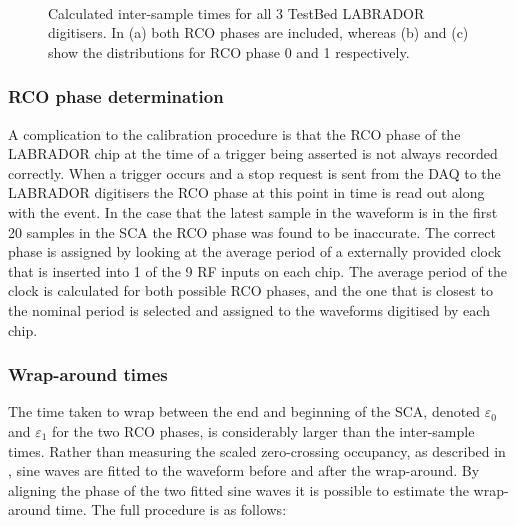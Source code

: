 \begin{figure}[htpb]
  \\
  \hfill
  \caption{Calculated inter-sample times for all 3 TestBed LABRADOR digitisers. In (a) both RCO phases are included, whereas (b) and (c) show the distributions for RCO phase 0 and 1 respectively.}
  \label{fig:calibration:LABRADOR-Digitiser-Chip:Inter-sample-times}
\end{figure}

\subsubsection{RCO phase determination}
\label{sec:calibration:LABRADOR-Digitiser-Chip:RCO-phase-determination}

A complication to the calibration procedure is that the RCO phase of the LABRADOR chip at the time of a trigger being asserted is not always recorded correctly. When a trigger occurs and a stop request is sent from the DAQ to the LABRADOR digitisers the RCO phase at this point in time is read out along with the event. In the case that the latest sample in the waveform is in the first 20 samples in the SCA the RCO phase was found to be inaccurate. The correct phase is assigned by looking at the average period of a externally provided clock that is inserted into 1 of the 9 RF inputs on each chip. The average period of the clock is calculated for both possible RCO phases, and the one that is closest to the nominal period is selected and assigned to the waveforms digitised by each chip.


\subsubsection{Wrap-around times}
\label{sec:calibration:LABRADOR-Digitiser-Chip:Wrap-around-times}

The time taken to wrap between the end and beginning of the SCA, denoted $\varepsilon_{0}$ and $\varepsilon_{1}$ for the two RCO phases, is considerably larger than the inter-sample times. Rather than measuring the scaled zero-crossing occupancy, as described in , sine waves are fitted to the waveform before and after the wrap-around. By aligning the phase of the two fitted sine waves it is possible to estimate the wrap-around time. The full procedure is as follows:

